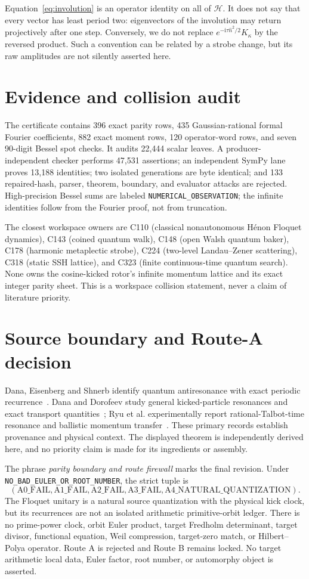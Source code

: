 \documentclass[10pt]{article}
\newcommand{\HH}{\mathcal H}
\newcommand{\opn}{\widehat n}
\newcommand{\ii}{\mathrm i}
\begin{document}
Equation~\eqref{eq:involution} is an operator identity on all of $\HH$.
It does not say that every vector has least period two: eigenvectors of the
involution may return projectively after one step.  Conversely, we do not
replace $e^{-\ii\tau\opn^2/2}K_\kappa$ by the reversed product.  Such a
convention can be related by a strobe change, but its raw amplitudes are not
silently asserted here.

\section{Evidence and collision audit}
The certificate contains 396 exact parity rows, 435 Gaussian-rational
formal Fourier coefficients, 882 exact moment rows, 120 operator-word rows,
and seven 90-digit Bessel spot checks.  It audits 22,444 scalar leaves.  A
producer-independent checker performs 47,531 assertions; an independent
SymPy lane proves 13,188 identities; two isolated generations are byte
identical; and 133 repaired-hash, parser, theorem, boundary, and evaluator
attacks are rejected.  High-precision Bessel sums are labeled
\texttt{NUMERICAL\_OBSERVATION}; the infinite identities follow from the
Fourier proof, not from truncation.

The closest workspace owners are C110 (classical nonautonomous H\'enon
Floquet dynamics), C143 (coined quantum walk), C148 (open Walsh quantum
baker), C178 (harmonic metaplectic strobe), C224 (two-level Landau--Zener
scattering), C318 (static SSH lattice), and C323 (finite continuous-time
quantum search).  None owns the cosine-kicked rotor's infinite momentum
lattice and its exact integer parity sheet.  This is a workspace collision
statement, never a claim of literature priority.

\section{Source boundary and Route-A decision}
Dana, Eisenberg and Shnerb identify quantum antiresonance with exact periodic
recurrence~\cite{Dana1996}.  Dana and Dorofeev study general kicked-particle
resonances and exact transport quantities~\cite{DanaDorofeev2006}; Ryu et al.
experimentally report rational-Talbot-time resonance and ballistic momentum
transfer~\cite{Ryu2006}.  These primary records establish provenance and
physical context.  The displayed theorem is independently derived here, and
no priority claim is made for its ingredients or assembly.

The phrase \emph{parity boundary and route firewall} marks the final
revision.  Under \texttt{NO\_BAD\_EULER\_OR\_ROOT\_NUMBER}, the strict tuple is
\[
 (\mathrm{A0\_FAIL},\mathrm{A1\_FAIL},\mathrm{A2\_FAIL},
  \mathrm{A3\_FAIL},\mathrm{A4\_NATURAL\_QUANTIZATION}).
\]
The Floquet unitary is a natural source quantization with the physical kick
clock, but its recurrences are not an isolated arithmetic primitive-orbit
ledger.  There is no prime-power clock, orbit Euler product, target Fredholm
determinant, target divisor, functional equation, Weil compression,
target-zero match, or Hilbert--Polya operator.  Route A is rejected and Route
B remains locked.  No target arithmetic local data, Euler factor, root
number, or automorphy object is asserted.
\end{document}
